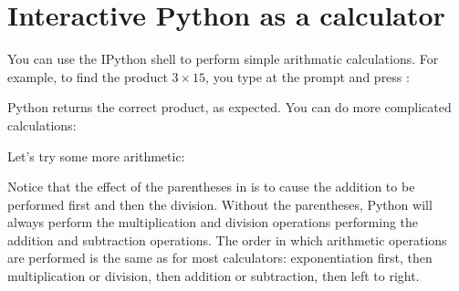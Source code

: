 \documentclass[letterpaper,10pt,english]{sphinxmanual}
\begin{document}
\section{Interactive Python as a calculator}
\label{\detokenize{chap2/chap2_basics:interactive-python-as-a-calculator}}
\sphinxAtStartPar
You can use the IPython shell to perform simple arithmatic calculations.  For example, to find the product \(3\times 15\), you type  at the  prompt and press :

\begin{sphinxVerbatim}[commandchars=\\\{\}]
\end{sphinxVerbatim}

\sphinxAtStartPar
Python returns the correct product, as expected.  You can do more complicated calculations:

\begin{sphinxVerbatim}[commandchars=\\\{\}]
\end{sphinxVerbatim}

\sphinxAtStartPar
Let’s try some more arithmetic:

\begin{sphinxVerbatim}[commandchars=\\\{\}]
\end{sphinxVerbatim}

\sphinxAtStartPar
Notice that the effect of the parentheses in  is to cause the addition to be performed first and then the division.  Without the parentheses, Python will always perform the multiplication and division operations  performing the addition and subtraction operations.  The order in which arithmetic operations are performed is the same as for most calculators: exponentiation first, then multiplication or division, then addition or subtraction, then left to right.
\end{document}

